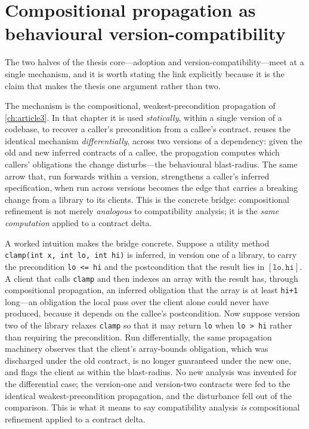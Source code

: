 \section{Compositional propagation as behavioural version-compatibility}

The two halves of the thesis core---adoption and version-compatibility---meet at a
single mechanism, and it is worth stating the link explicitly because it is the
claim that makes the thesis one argument rather than two.

The mechanism is the compositional, weakest-precondition propagation of
\cref{ch:article3}. In that chapter it is used \emph{statically}, within a single
version of a codebase, to recover a caller's precondition from a callee's contract.
 reuses the identical mechanism \emph{differentially}, across two
versions of a dependency: given the old and new inferred contracts of a callee, the
propagation computes which callers' obligations the change disturbs---the
behavioural blast-radius. The same arrow that, run forwards within a version,
strengthens a caller's inferred specification, when run across versions becomes the
edge that carries a breaking change from a library to its clients. This is the
concrete bridge: compositional refinement is not merely \emph{analogous} to
compatibility analysis; it is the \emph{same computation} applied to a contract
delta.

A worked intuition makes the bridge concrete. Suppose a utility method
\texttt{clamp(int x, int lo, int hi)} is inferred, in version one of a library, to
carry the precondition \texttt{lo <= hi} and the postcondition that the result lies
in $[\mathtt{lo},\mathtt{hi}]$. A client that calls \texttt{clamp} and then indexes
an array with the result has, through compositional propagation, an inferred
obligation that the array is at least \texttt{hi+1} long---an obligation the local
pass over the client alone could never have produced, because it depends on the
callee's postcondition. Now suppose version two of the library relaxes
\texttt{clamp} so that it may return \texttt{lo} when \texttt{lo > hi} rather than
requiring the precondition. Run differentially, the same propagation machinery
observes that the client's array-bounds obligation, which was discharged under the
old contract, is no longer guaranteed under the new one, and flags the client as
within the blast-radius. No new analysis was invented for the differential case;
the version-one and version-two contracts were fed to the identical
weakest-precondition propagation, and the disturbance fell out of the comparison.
This is what it means to say compatibility analysis \emph{is} compositional
refinement applied to a contract delta.

